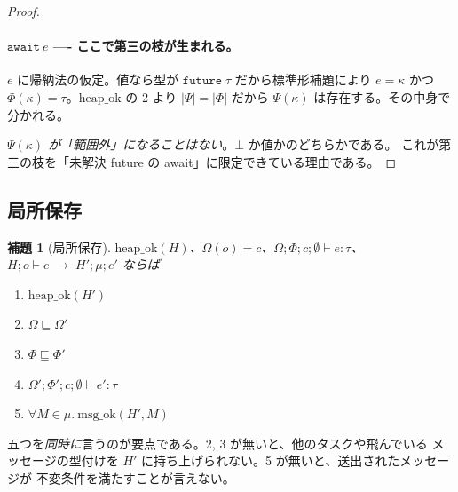 \documentclass[11pt,a4paper]{ltjsarticle}
\newtheorem{lemma}[theorem]{補題}
\theoremstyle{definition}
\theoremstyle{remark}
\newcommand{\tfut}[1]{\mathtt{future}\;#1}
\newcommand{\Om}{\Omega}          %
\newcommand{\Ph}{\Phi}            %
\newcommand{\Ps}{\Psi}            %
\newcommand{\jt}[3]{\Om;\Ph;#1;#2 \vdash #3}
\newcommand{\tstep}[6]{#1; #2 \vdash #3 \;\longrightarrow\; #4; #5; #6}
\newcommand{\heapok}{\mathrm{heap\_ok}}
\newcommand{\msgok}{\mathrm{msg\_ok}}
\newcommand{\awaiting}{\mathrm{awaiting}}
\begin{document}
\begin{proof}
\paragraph{$\mathtt{await}\ e$ ---- ここで第三の枝が生まれる。}
$e$ に帰納法の仮定。値なら型が $\tfut{\tau}$ だから標準形補題により
$e = \kappa$ かつ $\Ph(\kappa) = \tau$。$\heapok$ の 2 より $|\Ps| = |\Ph|$
だから $\Ps(\kappa)$ は存在する。その中身で分かれる。


\emph{$\Ps(\kappa)$ が「範囲外」になることはない}。$\bot$ か値かのどちらかである。
これが第三の枝を「未解決 future の await」に限定できている理由である。
\end{proof}

\subsection{局所保存}

\begin{lemma}[局所保存]
\label{lem:lpres}
$\heapok(H)$、$\Om(o) = c$、$\jt{c}{\emptyset}{e : \tau}$、
$\tstep{H}{o}{e}{H'}{\mu}{e'}$ ならば
\begin{enumerate}
\item $\heapok(H')$
\item $\Om \sqsubseteq \Om'$
\item $\Ph \sqsubseteq \Ph'$
\item $\Om';\Ph';c;\emptyset \vdash e' : \tau$
\item $\forall M \in \mu.\ \msgok(H', M)$
\end{enumerate}
\end{lemma}

五つを\emph{同時に}言うのが要点である。2, 3 が無いと、他のタスクや飛んでいる
メッセージの型付けを $H'$ に持ち上げられない。5 が無いと、送出されたメッセージが
不変条件を満たすことが言えない。
\end{document}
